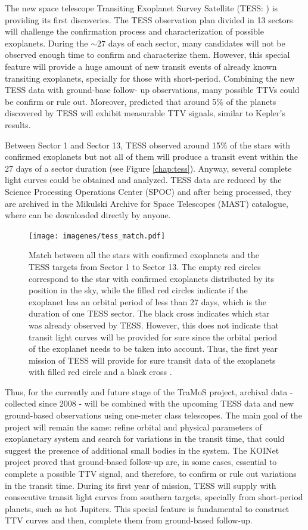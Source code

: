The new space telescope Transiting Exoplanet Survey Satellite (TESS: \cite{Ricker2014}) is providing its first discoveries. The TESS observation plan divided in 13 sectors will challenge the confirmation process and characterization of possible exoplanets. During the $\sim27$ days of each sector, many candidates will not be observed enough time to confirm and characterize them. However, this special feature will provide a huge amount of new transit events of already known transiting exoplanets, specially for those with short-period. Combining the new TESS data with ground-base follow- up observations, many possible TTVs could be confirm or rule out. Moreover, \cite{Ballard2018} predicted that around 5\% of the planets discovered by TESS will exhibit measurable TTV signals, similar to Kepler’s results.

Between Sector 1 and Sector 13, TESS observed around 15\% of the stars with confirmed exoplanets but not all of them will produce a transit event within the 27 days of a sector duration (see Figure \ref{chap:tess}). Anyway, several complete light curves could be obtained and analyzed. TESS data are reduced by the Science Processing Operations Center (SPOC) and after being processed, they are archived in the Mikulski Archive for Space Telescopes (MAST) catalogue, where can be downloaded directly by anyone. 

\begin{figure}
\centering
\texttt{[image: imagenes/tess\_match.pdf]}
\caption{Match between all the stars with confirmed exoplanets and the TESS targets from Sector 1 to Sector 13. The empty red circles correspond to the star with confirmed exoplanets distributed by its position in the sky, while the filled red circles indicate if the exoplanet has an orbital period of less than 27 days, which is the duration of one TESS sector. The black cross indicates which star was already observed by TESS. However, this does not indicate that transit light curves will be provided for sure since the orbital period of the exoplanet needs to be taken into account. Thus, the first year mission of TESS will provide for sure transit data of the exoplanets with filled red circle and a black cross .}
\label{match_tess}
\end{figure}

Thus, for the currently and future stage of the TraMoS project, archival data - collected since 2008 - will be combined with the upcoming TESS data and new ground-based observations using one-meter class telescopes. The main goal of the project will remain the same: refine orbital and physical parameters of exoplanetary system and search for variations in the transit time, that could suggest the presence of additional small bodies in the system.  The KOINet project proved that ground-based follow-up are, in some cases, essential to complete a possible TTV signal, and therefore, to confirm or rule out variations in the transit time. During its first year of mission, TESS will supply with consecutive transit light curves from southern targets, specially from short-period planets, such as hot Jupiters. This special feature is fundamental to construct TTV curves and then, complete them from ground-based follow-up.

